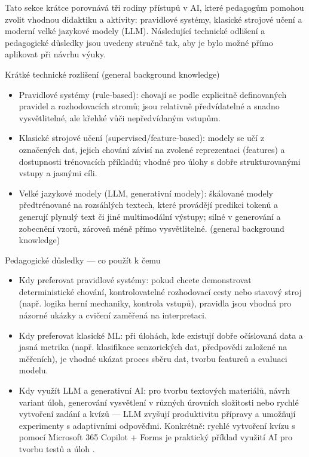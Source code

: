 Tato sekce krátce porovnává tři rodiny přístupů v AI, které pedagogům pomohou zvolit vhodnou didaktiku a aktivity: pravidlové systémy, klasické strojové učení a moderní velké jazykové modely (LLM). Následující technické odlišení a pedagogické důsledky jsou uvedeny stručně tak, aby je bylo možné přímo aplikovat při návrhu výuky.

Krátké technické rozlišení (general background knowledge)
\begin{itemize}
  \item Pravidlové systémy (rule‑based): chovají se podle explicitně definovaných pravidel a rozhodovacích stromů; jsou relativně předvídatelné a snadno vysvětlitelné, ale křehké vůči nepředvídaným vstupům.
  \item Klasické strojové učení (supervised/feature‑based): modely se učí z označených dat, jejich chování závisí na zvolené reprezentaci (features) a dostupnosti trénovacích příkladů; vhodné pro úlohy s dobře strukturovanými vstupy a jasnými cíli.
  \item Velké jazykové modely (LLM, generativní modely): škálované modely předtrénované na rozsáhlých textech, které provádějí predikci tokenů a generují plynulý text či jiné multimodální výstupy; silné v generování a zobecnění vzorů, zároveň méně přímo vysvětlitelné. (general background knowledge)
\end{itemize}

Pedagogické důsledky — co použít k čemu
\begin{itemize}
  \item Kdy preferovat pravidlové systémy: pokud chcete demonstrovat deterministické chování, kontrolovatelné rozhodovací cesty nebo stavový stroj (např. logika herní mechaniky, kontrola vstupů), pravidla jsou vhodná pro názorné ukázky a cvičení zaměřená na interpretaci.
  \item Kdy preferovat klasické ML: při úlohách, kde existují dobře očíslovaná data a jasná metrika (např. klasifikace senzorických dat, předpovědi založené na měřeních), je vhodné ukázat proces sběru dat, tvorbu featureů a evaluaci modelu.
  \item Kdy využít LLM a generativní AI: pro tvorbu textových materiálů, návrh variant úloh, generování vysvětlení v různých úrovních složitosti nebo rychlé vytvoření zadání a kvízů — LLM zvyšují produktivitu přípravy a umožňují experimenty s adaptivními odpověďmi. Konkrétně: rychlé vytvoření kvízu s pomocí Microsoft 365 Copilot + Forms je praktický příklad využití AI pro tvorbu testů a úloh \cite{kb_ai_101_tipu_pdf_04e4a115_page_8_1}.
\end{itemize}

